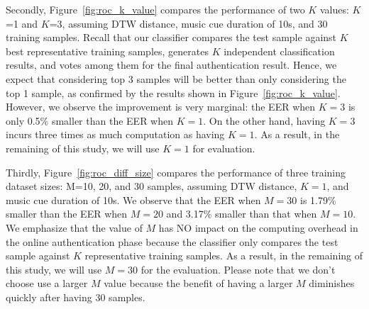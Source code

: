 Secondly, Figure~\ref{fig:roc_k_value} compares the performance of two $K$ values: $K$=1 and $K$=3, assuming DTW distance, music cue duration of 10s, and 30 training samples. Recall that
our classifier compares the test sample against $K$ best representative training samples, generates $K$ independent classification results, and votes among them for the final authentication result. Hence, we expect that considering top 3 samples will be better than only considering the top 1 sample, as confirmed by the results shown in Figure~\ref{fig:roc_k_value}. However, we observe the improvement is very marginal: the EER when $K=3$ is only 0.5\% smaller than the EER when $K=1$. On the other hand, having $K=3$ incurs three times as much computation as having $K=1$. As a result, in the remaining of this study, we will use $K=1$ for evaluation.

Thirdly, Figure~\ref{fig:roc_diff_size} compares the performance of three training dataset sizes: M=10, 20, and 30 samples, assuming DTW distance, $K=1$, and music cue duration of 10s. We observe that the EER when $M=30$ is 1.79\% smaller than the EER when $M=20$ and 3.17\% smaller than that when $M=10$.  We emphasize that the value of $M$ has NO impact on the computing overhead in the online authentication phase because the classifier only compares the test sample against $K$ representative training samples. As a result, in the remaining of this study, we will use $M=30$ for the evaluation. Please note that we don't choose use a larger $M$ value because the benefit of having a larger $M$ diminishes quickly after having 30 samples. 
 


